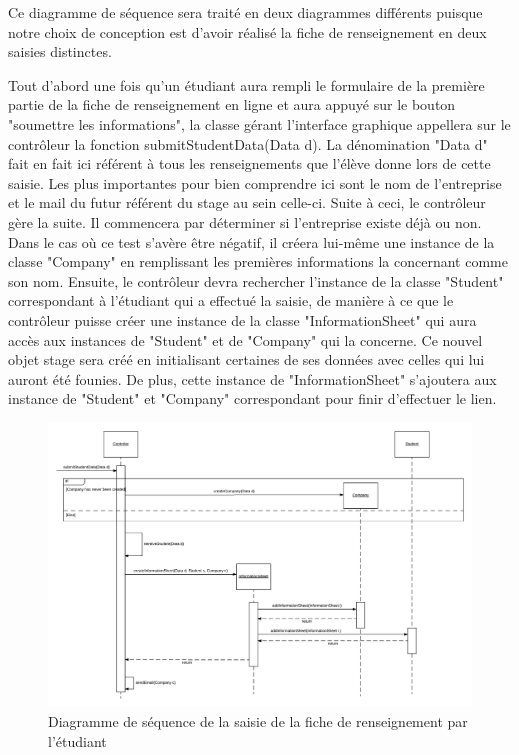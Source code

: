 \documentclass{scrreprt}
\begin{document}
	Ce diagramme de séquence sera traité en deux diagrammes différents puisque notre choix de conception est d'avoir réalisé
la fiche de renseignement en deux saisies distinctes.

	Tout d'abord une fois qu'un étudiant aura rempli le formulaire de la première partie de la fiche de renseignement en ligne et aura
appuyé sur le bouton "soumettre les informations", la classe gérant l'interface graphique appellera sur le contrôleur la fonction 
submitStudentData(Data d). La dénomination "Data d" fait en fait ici référent à tous les renseignements que l'élève donne lors de 
cette saisie. Les plus importantes pour bien comprendre ici sont le nom de l'entreprise et le mail du futur référent du stage au sein
celle-ci. Suite à ceci, le contrôleur gère la suite. Il commencera par déterminer si l'entreprise existe déjà ou non. Dans le cas où
ce test s'avère être négatif, il créera lui-même une instance de la classe "Company" en remplissant les premières informations la 
concernant comme son nom. Ensuite, le contrôleur devra rechercher l'instance de la classe "Student" correspondant à l'étudiant qui
a effectué la saisie, de manière à ce que le contrôleur puisse créer une instance de la classe "InformationSheet" qui aura accès aux instances
de "Student" et de "Company" qui la concerne. Ce nouvel objet stage sera créé en initialisant certaines de ses données avec celles qui lui
auront été founies. De plus, cette instance de "InformationSheet" s'ajoutera aux instance de "Student" et "Company" correspondant pour finir 
d'effectuer le lien.

\newpage
\begin{figure}[h]
\centering
\includegraphics[width=15cm]{images/submitStudentSeqDiagram.png}
\caption{Diagramme de séquence de la saisie de la fiche de renseignement par l'étudiant}
\end{figure}
\end{document}
